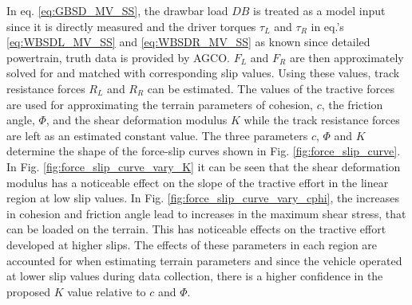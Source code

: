 In eq. \ref{eq:GBSD_MV_SS}, the drawbar load $DB$ is treated as a model input since it is directly measured and the driver torques $\tau_L$ and $\tau_R$ in eq.'s \ref{eq:WBSDL_MV_SS} and \ref{eq:WBSDR_MV_SS} as known since detailed powertrain, truth data is provided by AGCO. $F_L$ and $F_R$ are then approximately solved for and matched with corresponding slip values. Using these values, track resistance forces $R_L$ and $R_R$ can be estimated. The values of the tractive forces are used for approximating the terrain parameters of cohesion, $c$, the friction angle, $\Phi$, and the shear deformation modulus $K$ while the track resistance forces are left as an estimated constant value. The three parameters $c$, $\Phi$ and $K$ determine the shape of the force-slip curves shown in Fig. \ref{fig:force_slip_curve}. In Fig. \ref{fig:force_slip_curve_vary_K} it can be seen that the shear deformation modulus has a noticeable effect on the slope of the tractive effort in the linear region at low slip values. In Fig. \ref{fig:force_slip_curve_vary_cphi}, the increases in cohesion and friction angle lead to increases in the maximum shear stress,  that can be loaded on the terrain. This has noticeable effects on the tractive effort developed at higher slips. The effects of these parameters in each region are accounted for when estimating terrain parameters and since the vehicle operated at lower slip values during data collection, there is a higher confidence in the proposed $K$ value relative to $c$ and $\Phi$.


